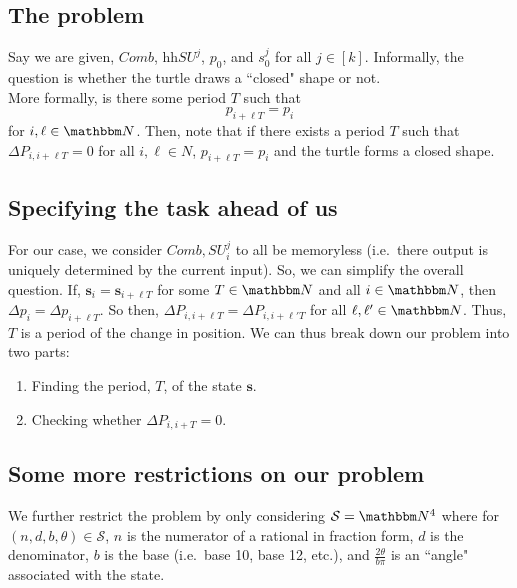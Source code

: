 \documentclass[11pt,titlepage]{article}
\begin{document}
\subsection{The problem}
Say we are given, $Comb$, hh$SU^j$, $p_0$, and $s^j_0$ for all $j \in [k]$.
Informally, the question is whether the turtle draws a ``closed" shape or not.\\
More formally, is there some period $T$ such that 
$$
  p_{i + \ell T} = p_{i}
$$
for $i, \ell \in \N$.
Then, note that if there exists a period $T$ such that 
$\Delta P_{i, i + \ell T} = 0$ for all $i, \ell \in N$, 
$p_{i + \ell T} = p_{i}$ and the turtle forms a closed shape.


\subsection{Specifying the task ahead of us}
For our case, we consider $Comb, SU_i^j$ to all be memoryless (i.e.\ there output
is uniquely determined by the current input). So, we can simplify the overall question.
If, $\pmb{s}_i = \pmb{s}_{i + \ell T}$ for some $T \in \N$ and all $i \in \N$, then 
$\Delta p_{i} = \Delta p_{i + \ell T}$. So then,
$\Delta P_{i, i + \ell T} = \Delta P_{i, i + \ell' T}$ for all $\ell, \ell' \in \N$.
Thus, $T$ is a period of the change in position. We can thus
break down our problem into two parts:
\begin{enumerate}
  \item Finding the period, $T$, of the state $\pmb{s}$.
  \item Checking whether $\Delta P_{i, i + T} = 0$.
\end{enumerate}

\subsection{Some more restrictions on our problem}
We further restrict the problem by only considering $\mathcal{S} = \N^4$ where for $(n, d, b, \theta) \in \mathcal{S}$,
$n$ is the numerator of a rational in fraction form, $d$ is the denominator, 
$b$ is the base (i.e.\ base 10, base 12, etc.),
and $\frac{2\theta}{b \pi}$ is an ``angle" associated with the state.
\end{document}
